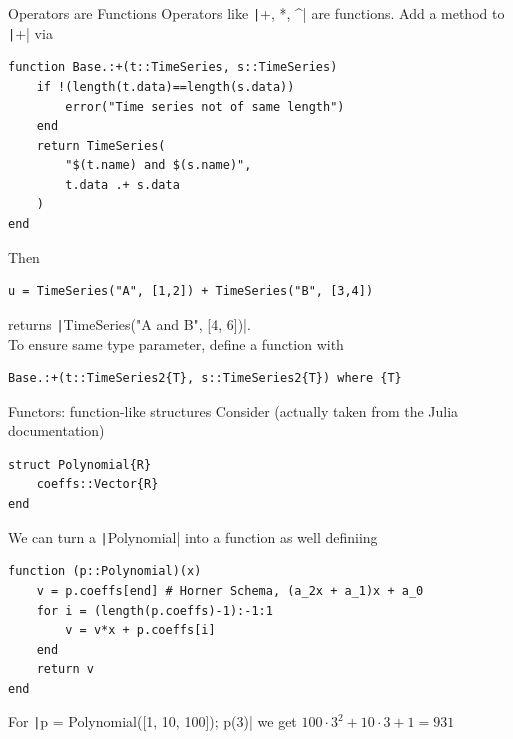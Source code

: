 \documentclass[aspectratio=169, 12pt]{beamer}
\begin{document}
    \begin{frame}[fragile]{Operators are Functions}
        Operators like \texttt|+, *, ^| are \alert{functions}. Add a method to \texttt|+| via
        \begin{verbatim}
function Base.:+(t::TimeSeries, s::TimeSeries)
    if !(length(t.data)==length(s.data))
        error("Time series not of same length")
    end
    return TimeSeries(
        "$(t.name) and $(s.name)",
        t.data .+ s.data
    )
end
        \end{verbatim}
        \pause
        Then
        \begin{verbatim}
u = TimeSeries("A", [1,2]) + TimeSeries("B", [3,4])
        \end{verbatim}
        returns \texttt|TimeSeries("A and B", [4, 6])|.
        \\[.5\baselineskip]\pause
        To ensure same type parameter, define a function with
        \begin{verbatim}
Base.:+(t::TimeSeries2{T}, s::TimeSeries2{T}) where {T}
        \end{verbatim}
    \end{frame}
    \begin{frame}[fragile]{Functors: function-like structures}
    Consider (actually taken from the Julia documentation)
    \begin{verbatim}
struct Polynomial{R}
    coeffs::Vector{R}
end
    \end{verbatim}
    \pause
    We can turn a \texttt|Polynomial| into a function as well definiing
    \begin{verbatim}
function (p::Polynomial)(x)
    v = p.coeffs[end] # Horner Schema, (a_2x + a_1)x + a_0
    for i = (length(p.coeffs)-1):-1:1
        v = v*x + p.coeffs[i]
    end
    return v
end
    \end{verbatim}
    \pause
    For \texttt|p = Polynomial([1, 10, 100]); p(3)| we get $100\cdot3^2 + 10\cdot3 + 1 = 931$
    \end{frame}
\end{document}
